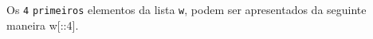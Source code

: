\documentclass[12pt,varwidth=16cm,border=1pt]{standalone}
\begin{document}
Os \verb+4+ \verb+primeiros+ elementos da lista \verb+w+, podem ser apresentados da seguinte maneira w[::4].

\questiomfalse
\end{document}
